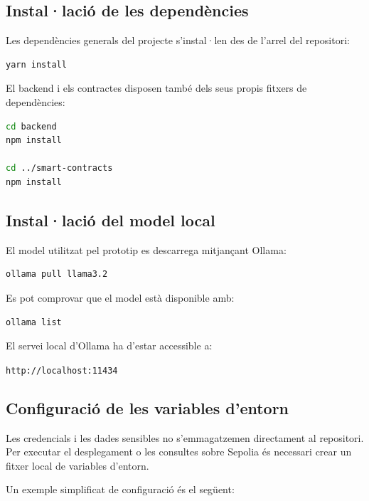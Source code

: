 \subsection{Instal·lació de les dependències}

Les dependències generals del projecte s’instal·len des de l’arrel del repositori:

\begin{lstlisting}[language=bash]
yarn install
\end{lstlisting}

El backend i els contractes disposen també dels seus propis fitxers de dependències:

\begin{lstlisting}[language=bash]
cd backend
npm install

cd ../smart-contracts
npm install
\end{lstlisting}

\subsection{Instal·lació del model local}

El model utilitzat pel prototip es descarrega mitjançant Ollama:

\begin{lstlisting}[language=bash]
ollama pull llama3.2
\end{lstlisting}

Es pot comprovar que el model està disponible amb:

\begin{lstlisting}[language=bash]
ollama list
\end{lstlisting}

El servei local d’Ollama ha d’estar accessible a:

\begin{center}
\texttt{http://localhost:11434}
\end{center}

\subsection{Configuració de les variables d’entorn}

Les credencials i les dades sensibles no s’emmagatzemen directament al repositori. Per executar el desplegament o les consultes sobre Sepolia és necessari crear un fitxer local de variables d’entorn.

Un exemple simplificat de configuració és el següent:

